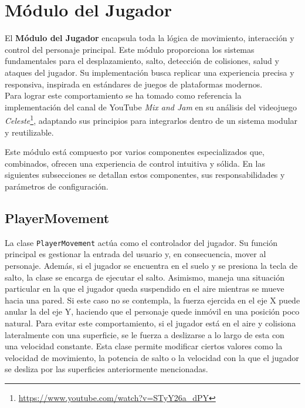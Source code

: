 \section{Módulo del Jugador} \label{sec:player}

El \textbf{Módulo del Jugador} encapsula toda la lógica de movimiento, interacción y control del personaje principal. Este módulo proporciona los sistemas fundamentales para el desplazamiento, salto, detección de colisiones, salud y ataques del jugador. Su implementación busca replicar una experiencia precisa y responsiva, inspirada en estándares de juegos de plataformas modernos.\\

Para lograr este comportamiento se ha tomado como referencia la implementación del canal de YouTube \textit{Mix and Jam} en su análisis del videojuego \textit{Celeste}\footnote{\url{https://www.youtube.com/watch?v=STyY26a_dPY}}, adaptando sus principios para integrarlos dentro de un sistema modular y reutilizable.

Este módulo está compuesto por varios componentes especializados que, combinados, ofrecen una experiencia de control intuitiva y sólida. En las siguientes subsecciones se detallan estos componentes, sus responsabilidades y parámetros de configuración.

\subsection{PlayerMovement}

La clase \texttt{PlayerMovement} actúa como el controlador del jugador. Su función principal es gestionar la entrada del usuario y, en consecuencia, mover al personaje. Además, si el jugador se encuentra en el suelo y se presiona la tecla de salto, la clase se encarga de ejecutar el salto.
Asimismo, maneja una situación particular en la que el jugador queda suspendido en el aire mientras se mueve hacia una pared. Si este caso no se contempla, la fuerza ejercida en el eje X puede anular la del eje Y, haciendo que el personaje quede inmóvil en una posición poco natural. Para evitar este comportamiento, si el jugador está en el aire y colisiona lateralmente con una superficie, se le fuerza a deslizarse a lo largo de esta con una velocidad constante.
Esta clase permite modificar ciertos valores como la velocidad de movimiento, la potencia de salto o la velocidad con la que el jugador se desliza por las superficies anteriormente mencionadas.\\

